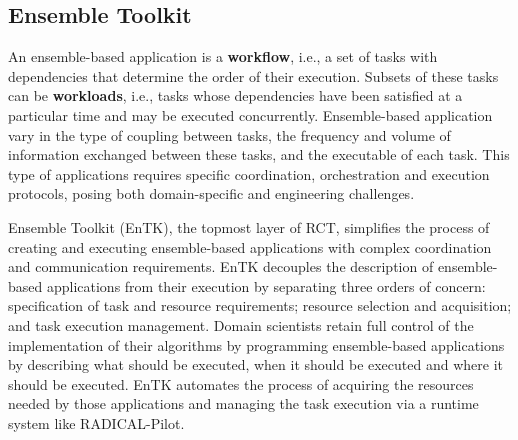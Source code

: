\subsection{Ensemble Toolkit}

An ensemble-based application is a \textbf{workflow}, i.e., a set of tasks
with dependencies that determine the order of their execution. Subsets of
these tasks can be \textbf{workloads}, i.e., tasks whose dependencies have
been satisfied at a particular time and may be executed concurrently.
Ensemble-based application vary in the type of coupling between tasks, the
frequency and volume of information exchanged between these tasks, and the
executable of each task. This type of applications requires specific
coordination, orchestration and execution protocols, posing both
domain-specific and engineering challenges.

Ensemble Toolkit (EnTK), the topmost layer of RCT, simplifies the process of
creating and executing ensemble-based applications with complex coordination
and communication requirements. EnTK decouples the description of
ensemble-based applications from their execution by separating three orders
of concern: specification of task and resource requirements; resource
selection and acquisition; and task execution management. Domain scientists
retain full control of the implementation of their algorithms by programming
ensemble-based applications by describing what should be executed, when it
should be executed and where it should be executed. 
EnTK automates the
process of acquiring the resources needed by those applications and managing
the task execution via a runtime system like RADICAL-Pilot.






